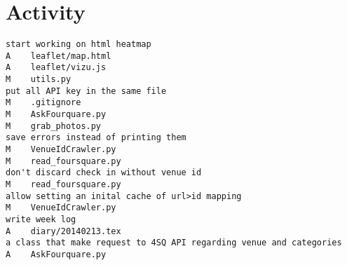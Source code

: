 \section*{Activity}
\begin{verbatim}
start working on html heatmap
A    leaflet/map.html
A    leaflet/vizu.js
M    utils.py
put all API key in the same file
M    .gitignore
M    AskFourquare.py
M    grab_photos.py
save errors instead of printing them
M    VenueIdCrawler.py
M    read_foursquare.py
don't discard check in without venue id
M    read_foursquare.py
allow setting an inital cache of url>id mapping
M    VenueIdCrawler.py
write week log
A    diary/20140213.tex
a class that make request to 4SQ API regarding venue and categories
A    AskFourquare.py
\end{verbatim}
